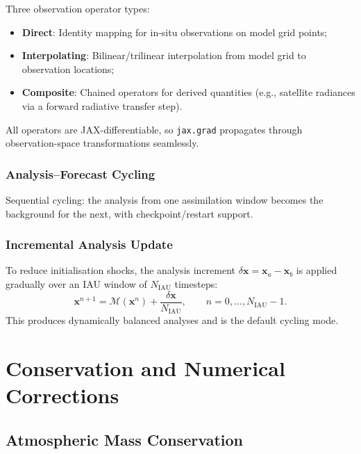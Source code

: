 \documentclass[11pt,twoside]{report}
\newcommand{\vect}[1]{\bm{#1}}
\begin{document}
Three observation operator types:
\begin{itemize}[nosep]
  \item \textbf{Direct}: Identity mapping for in-situ observations on model
    grid points;
  \item \textbf{Interpolating}: Bilinear/trilinear interpolation from model
    grid to observation locations;
  \item \textbf{Composite}: Chained operators for derived quantities
    (e.g., satellite radiances via a forward radiative transfer step).
\end{itemize}
All operators are JAX-differentiable, so \texttt{jax.grad} propagates
through observation-space transformations seamlessly.

\subsection{Analysis--Forecast Cycling}

Sequential cycling: the analysis from one assimilation window becomes the
background for the next, with checkpoint/restart support.

\subsection{Incremental Analysis Update}

To reduce initialisation shocks, the analysis increment
$\delta\vect{x}=\vect{x}_a-\vect{x}_b$ is applied gradually over an
IAU window of $N_{\mathrm{IAU}}$ timesteps:
\begin{equation}
  \vect{x}^{n+1} = \mathcal{M}(\vect{x}^n) + \frac{\delta\vect{x}}{N_{\mathrm{IAU}}},
  \qquad n = 0,\ldots,N_{\mathrm{IAU}}-1.
\end{equation}
This produces dynamically balanced analyses and is the default cycling mode.


\chapter{Conservation and Numerical Corrections}
\label{ch:conservation}

\section{Atmospheric Mass Conservation}
\end{document}
